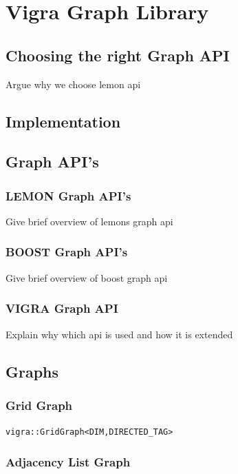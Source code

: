 \chapter{Vigra Graph Library} \label{ch:vigra_graph_lib}


\section{Choosing the right Graph API}

Argue why we choose lemon api 

\section{Implementation}\label{sec:vigra_graph_lib_impl}

\section{Graph API's}\label{sec:graph_apis}

    \subsection{LEMON Graph API's}\label{sec:lemon_graph_apis}
    Give brief overview of lemons graph api 
    \subsection{BOOST Graph API's}\label{sec:boost_graph_apis}
    Give brief overview of boost graph api
    \subsection{VIGRA Graph API}
    Explain why which api is used and how it is extended


\section{Graphs}


\subsection{Grid Graph}


    \lstinline{vigra::GridGraph<DIM,DIRECTED_TAG>}

\subsection{Adjacency List Graph}

